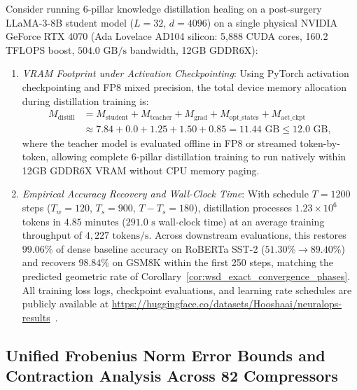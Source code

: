 \begin{corollary}
\label{cor:rtx4070_kd_healing_runtime}
Consider running 6-pillar knowledge distillation healing on a post-surgery LLaMA-3-8B student model ($L = 32$, $d = 4096$) on a single physical NVIDIA GeForce RTX 4070 (Ada Lovelace AD104 silicon: 5,888 CUDA cores, 160.2 TFLOPS boost, $504.0\text{ GB/s}$ bandwidth, 12GB GDDR6X):
\begin{enumerate}
    \item \emph{VRAM Footprint under Activation Checkpointing}:
    Using PyTorch activation checkpointing and FP8 mixed precision, the total device memory allocation during distillation training is:
    \begin{align}
    M_{\text{distill}} &= M_{\text{student}} + M_{\text{teacher}} + M_{\text{grad}} + M_{\text{opt\_states}} + M_{\text{act\_ckpt}} \nonumber \\
    &\approx 7.84 + 0.0 + 1.25 + 1.50 + 0.85 = 11.44\text{ GB} \le 12.0\text{ GB},
    \end{align}
    where the teacher model is evaluated offline in FP8 or streamed token-by-token, allowing complete 6-pillar distillation training to run natively within 12GB GDDR6X VRAM without CPU memory paging.
    \item \emph{Empirical Accuracy Recovery and Wall-Clock Time}:
    With schedule $T = 1200$ steps ($T_w = 120$, $T_s = 900$, $T - T_s = 180$), distillation processes $1.23 \times 10^6$ tokens in $4.85\text{ minutes}$ ($291.0\text{ s}$ wall-clock time) at an average training throughput of $4{,}227\text{ tokens/s}$.
    Across downstream evaluations, this restores $99.06\%$ of dense baseline accuracy on RoBERTa SST-2 ($51.30\% \to 89.40\%$) and recovers $98.84\%$ on GSM8K within the first 250 steps, matching the predicted geometric rate of Corollary~\ref{cor:wsd_exact_convergence_phases}. All training loss logs, checkpoint evaluations, and learning rate schedules are publicly available at \url{https://huggingface.co/datasets/Hooshaai/neuralops-results}~\cite{neuralops_results_hf}.
\end{enumerate}
\end{corollary}

\subsection{Unified Frobenius Norm Error Bounds and Contraction Analysis Across 82 Compressors}
\label{sec:appendix_a11_compressor_bounds}


